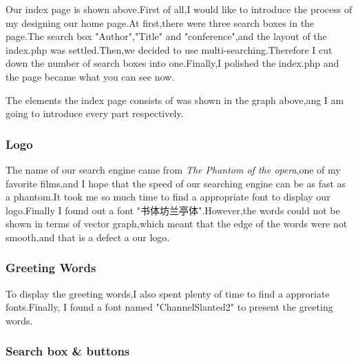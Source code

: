 \documentclass[10pt,twoside,a4paper,titlepage]{article}
\begin{document}
	Our index page is shown above.First of all,I would like to introduce the process of my designing our home page.At first,there were three search boxes in the page.The search box "Author","Title" and "conference",and the layout of the index.php was settled.Then,we decided to use multi-searching.Therefore I cut down the number of search boxes into one.Finally,I polished the index.php and the page became what you can see now.
	
	The elements the index page consists of was shown in the graph above,ang I am going to introduce every part respectively.
	
	\subsubsection{Logo}
	
	The name of our search engine came from \emph{The Phantom of the opera},one of my favorite films,and I hope that the speed of our searching engine can be as fast as a phantom.It took me so much time to find a appropriate font to display our logo.Finally I found out a font "书体坊兰亭体".However,the words could not be shown in terms of vector graph,which meant that the edge of the words were not smooth,and that is a defect a our logo.
	
	\subsubsection{Greeting Words}
	
	To display the greeting words,I also spent plenty of time to find a approriate fonts.Finally, I found a font named "ChannelSlanted2" to present the greeting words.
	
	\subsubsection{Search box \& buttons}
	
\end{document}
